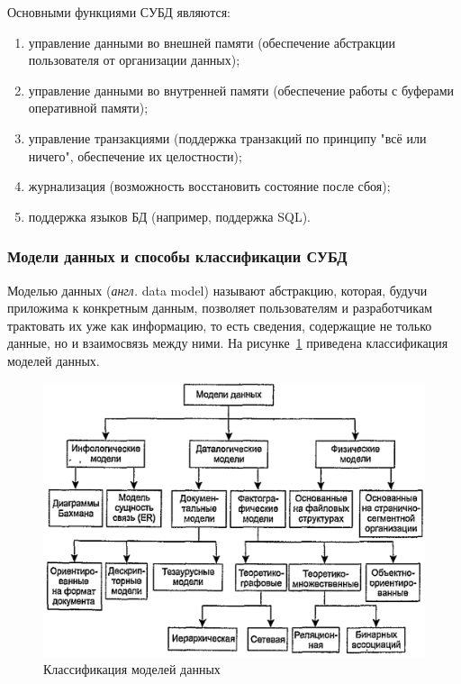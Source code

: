 Основными функциями СУБД являются:
\begin{enumerate}[label=\arabic*)]
	\item управление данными во внешней памяти (обеспечение абстракции пользователя от организации данных);
	\item управление данными во внутренней памяти (обеспечение работы с буферами оперативной памяти);
	\item управление транзакциями (поддержка транзакций по принципу "всё или ничего", обеспечение их целостности);
	\item журнализация (возможность восстановить состояние после сбоя);
	\item поддержка языков БД (например, поддержка SQL).
\end{enumerate}


\subsubsection{Модели данных и способы классификации СУБД}

Моделью данных  (\textit{англ.} data model) \cite{carpova-t-s} называют абстракцию, которая, будучи приложима к
конкретным данным, позволяет пользователям и разработчикам трактовать их уже как информацию, то есть сведения, содержащие не только данные, но и взаимосвязь между ними. На рисунке~\ref{fig:data-models} приведена классификация моделей данных.

\begin{figure}[h]
	\centering
	\captionsetup{justification=centering}
	\includegraphics[width=150mm]{datamodels.png}
	\caption{Классификация моделей данных}
	\label{fig:data-models}
\end{figure}

